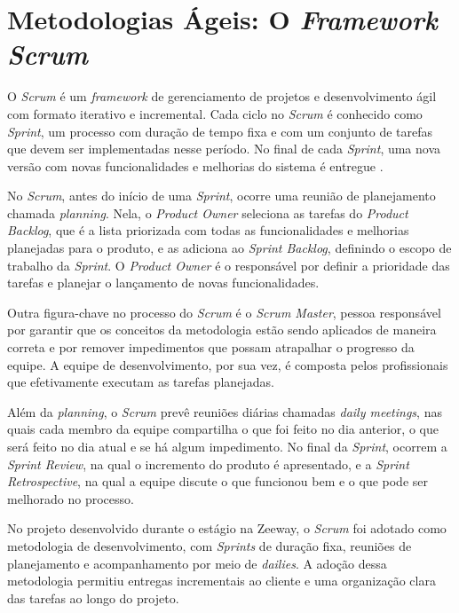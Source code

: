 \section{Metodologias Ágeis: O \textit{Framework Scrum}}

O \textit{Scrum} é um \textit{framework} de gerenciamento de projetos e desenvolvimento ágil com formato iterativo e incremental. Cada ciclo no \textit{Scrum} é conhecido como \textit{Sprint}, um processo com duração de tempo fixa e com um conjunto de tarefas que devem ser implementadas nesse período. No final de cada \textit{Sprint}, uma nova versão com novas funcionalidades e melhorias do sistema é entregue \cite{Schwaber2020}.

No \textit{Scrum}, antes do início de uma \textit{Sprint}, ocorre uma reunião de planejamento chamada \textit{planning}. Nela, o \textit{Product Owner} seleciona as tarefas do \textit{Product Backlog}, que é a lista priorizada com todas as funcionalidades e melhorias planejadas para o produto, e as adiciona ao \textit{Sprint Backlog}, definindo o escopo de trabalho da \textit{Sprint}. O \textit{Product Owner} é o responsável por definir a prioridade das tarefas e planejar o lançamento de novas funcionalidades.

Outra figura-chave no processo do \textit{Scrum} é o \textit{Scrum Master}, pessoa responsável por garantir que os conceitos da metodologia estão sendo aplicados de maneira correta e por remover impedimentos que possam atrapalhar o progresso da equipe. A equipe de desenvolvimento, por sua vez, é composta pelos profissionais que efetivamente executam as tarefas planejadas.

Além da \textit{planning}, o \textit{Scrum} prevê reuniões diárias chamadas \textit{daily meetings}, nas quais cada membro da equipe compartilha o que foi feito no dia anterior, o que será feito no dia atual e se há algum impedimento. No final da \textit{Sprint}, ocorrem a \textit{Sprint Review}, na qual o incremento do produto é apresentado, e a \textit{Sprint Retrospective}, na qual a equipe discute o que funcionou bem e o que pode ser melhorado no processo.

No projeto desenvolvido durante o estágio na Zeeway, o \textit{Scrum} foi adotado como metodologia de desenvolvimento, com \textit{Sprints} de duração fixa, reuniões de planejamento e acompanhamento por meio de \textit{dailies}. A adoção dessa metodologia permitiu entregas incrementais ao cliente e uma organização clara das tarefas ao longo do projeto.

